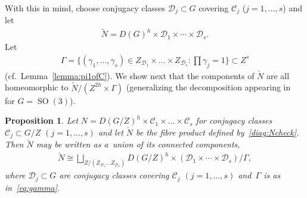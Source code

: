\documentclass[11pt]{article}
\numberwithin{equation}{section}
\newtheorem{Proposition}[Theorem]{Proposition}
{\theoremstyle{definition}
\newtheorem{Definition}[Theorem]{Definition}
\newtheorem{Example}[Theorem]{Example}
\newtheorem{Remark}[Theorem]{Remark}
}
\DeclareMathOperator{\SO}{SO}
\begin{document}
With this in mind, choose conjugacy classes $\mathcal{D}_j \subset G$ covering $\mathcal{C}_j$ ($j=1,\ldots, s$) and let
\begin{gather*}
\widetilde{N}= D(G)^h\times\mathcal{D}_1 \times \cdots \times \mathcal{D}_s.
\end{gather*}
Let
\begin{gather}
\label{eq:gamma}
\Gamma = \Big\{(\gamma_1, \ldots, \gamma_{s}) \in Z_{\mathcal{D}_1} \times \dots \times Z_{\mathcal{D}_s} \colon \prod
\gamma_j =1 \Big\} \subset Z^s
\end{gather}
(cf.~Lemma~\ref{lemma:pi1ofC}).
We show next that the components of $\check{N}$ are all homeomorphic to $\widetilde{N}/(Z^{2h}\times \Gamma)$
(generalizing the decomposition appearing in~\cite[Lemma~2.3]{KM} for $G=\SO(3)$).

\begin{Proposition}
\label{prop:comps}
Let $N=D(G/Z)^h\times \mathcal{C}_1 \times \dots \times \mathcal{C}_s $ for conjugacy classes $\mathcal{C}_j \subset
G/Z$ $(j=1,\ldots,s)$ and let $\check{N}$ be the fibre product defined by~\eqref{diag:Ncheck}.
Then $\check{N}$ may be written as a~union of its connected components,
\begin{gather*}
\check{N} \cong \bigsqcup_{Z/(Z_{\mathcal{D}_1} \dots Z_{\mathcal{D}_s})}D(G/Z)^h\times (\mathcal{D}_1 \times \cdots
\times \mathcal{D}_s)/{\Gamma},
\end{gather*}
where $\mathcal{D}_j \subset G$ are conjugacy classes covering $\mathcal{C}_j$ $(j=1,\ldots,s)$ and~$\Gamma$ is as
in~\eqref{eq:gamma}.
\end{Proposition}
\end{document}
